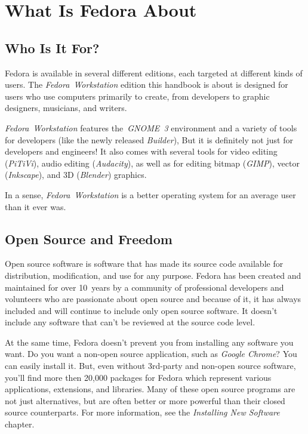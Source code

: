 \chapter*{What Is Fedora About}
\section*{Who Is It For?}

Fedora is available in several different editions, each targeted at different kinds of users. The \emph{Fedora~Workstation} edition this handbook is about is designed for users who use computers primarily to create, from developers to graphic designers, musicians, and writers.

\emph{Fedora~Workstation} features the~\emph{GNOME~3} environment and a variety of tools for developers (like the newly released \emph{Builder}),  But it is definitely not just for developers and engineers! It also comes with several tools for video editing (\emph{PiTiVi}), audio editing (\emph{Audacity}), as well as for editing bitmap (\emph{GIMP}), vector (\emph{Inkscape}), and 3D (\emph{Blender}) graphics.

In a sense, \emph{Fedora~Workstation} is a better operating system for an average user than it ever was.

\section*{Open Source and Freedom}

Open source software is software that has made its source code available for distribution, modification, and use for any purpose. Fedora has been created and maintained for over 10~years by a community of professional developers and volunteers who are passionate about open source and because of it, it has always included and will continue to include only open source software. It doesn't include any software that can't be reviewed at the source code level.

At the same time, Fedora doesn't prevent you from installing any software you want. Do you want a non-open source application, such as \emph{Google Chrome}? You can easily install it. But, even without 3rd-party and non-open source software, you'll find more then 20,000 packages for Fedora which represent various applications, extensions, and libraries. Many of these open source programs are not just alternatives, but are often better or more powerful than their closed source counterparts. For more information, see the \emph{Installing New Software} chapter.

